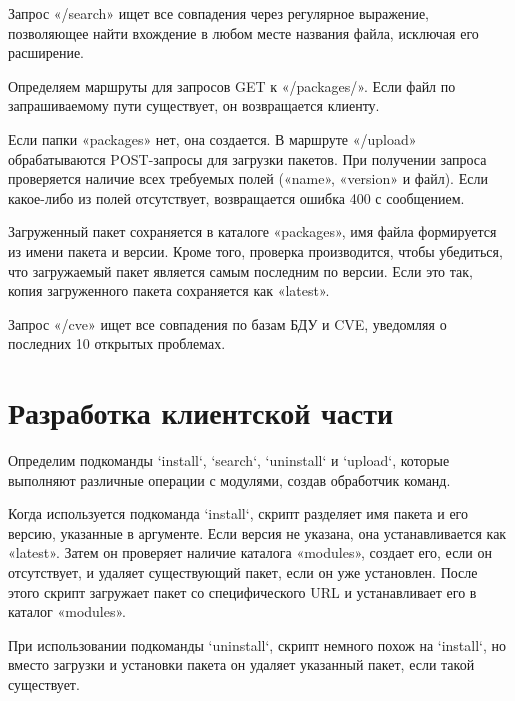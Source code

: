\begin{listing}[H]
\end{listing}
\label{lst:c}

Запрос «/search» ищет все совпадения через регулярное выражение, позволяющее найти вхождение в любом месте названия файла, исключая его расширение.

Определяем маршруты для запросов GET к «/packages/». Если файл по запрашиваемому пути существует, он возвращается клиенту. 

Если папки «packages» нет, она создается. В маршруте «/upload» обрабатываются POST-запросы для загрузки пакетов. При получении запроса проверяется наличие всех требуемых полей («name», «version» и файл). Если какое-либо из полей отсутствует, возвращается ошибка 400 с сообщением. 

\begin{listing}[H]
\end{listing}
\label{lst:c}

Загруженный пакет сохраняется в каталоге «packages», имя файла формируется из имени пакета и версии. Кроме того, проверка производится, чтобы убедиться, что загружаемый пакет является самым последним по версии. Если это так, копия загруженного пакета сохраняется как «latest». 

\begin{listing}[H]
\end{listing}
\label{lst:c}


Запрос «/cve» ищет все совпадения по базам БДУ и CVE, уведомляя о последних 10 открытых проблемах.


\section{Разработка клиентской части}

Определим подкоманды `install`, `search`, `uninstall` и `upload`, которые выполняют различные операции с модулями, создав обработчик команд.

Когда используется подкоманда `install`, скрипт разделяет имя пакета и его версию, указанные в аргументе. Если версия не указана, она устанавливается как «latest». Затем он проверяет наличие каталога «modules», создает его, если он отсутствует, и удаляет существующий пакет, если он уже установлен. После этого скрипт загружает пакет со специфического URL и устанавливает его в каталог «modules».

При использовании подкоманды `uninstall`, скрипт немного похож на `install`, но вместо загрузки и установки пакета он удаляет указанный пакет, если такой существует.

